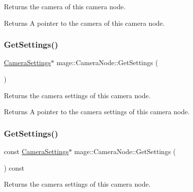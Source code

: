 Returns the camera of this camera node.

\begin{DoxyReturn}{Returns}
A pointer to the camera of this camera node. 
\end{DoxyReturn}
\hypertarget{classmage_1_1_camera_node_a0bd616c44db36301845b02a03f1db5ba}{}\label{classmage_1_1_camera_node_a0bd616c44db36301845b02a03f1db5ba} 
\subsubsection{\texorpdfstring{Get\+Settings()}{GetSettings()}\hspace{0.1cm}{\footnotesize\ttfamily [1/2]}}
{\footnotesize\ttfamily \hyperlink{classmage_1_1_camera_settings}{Camera\+Settings}$\ast$ mage\+::\+Camera\+Node\+::\+Get\+Settings (\begin{DoxyParamCaption}{ }\end{DoxyParamCaption})\hspace{0.3cm}{\ttfamily [noexcept]}}

Returns the camera settings of this camera node.

\begin{DoxyReturn}{Returns}
A pointer to the camera settings of this camera node. 
\end{DoxyReturn}
\hypertarget{classmage_1_1_camera_node_a1098f7929715018978b1bb8ac00c7148}{}\label{classmage_1_1_camera_node_a1098f7929715018978b1bb8ac00c7148} 
\subsubsection{\texorpdfstring{Get\+Settings()}{GetSettings()}\hspace{0.1cm}{\footnotesize\ttfamily [2/2]}}
{\footnotesize\ttfamily const \hyperlink{classmage_1_1_camera_settings}{Camera\+Settings}$\ast$ mage\+::\+Camera\+Node\+::\+Get\+Settings (\begin{DoxyParamCaption}{ }\end{DoxyParamCaption}) const\hspace{0.3cm}{\ttfamily [noexcept]}}

Returns the camera settings of this camera node.

